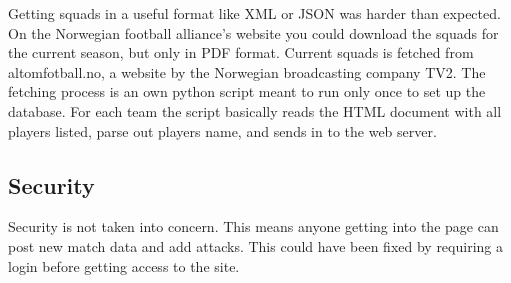 Getting squads in a useful format like \ac{XML} or \ac{JSON} was harder than expected. On the Norwegian football alliance's website you could download the squads for the current season, but only in PDF format. Current squads is fetched from altomfotball.no, a website by the Norwegian broadcasting company TV2. The fetching process is an own python script meant to run only once to set up the database. For each team the script basically reads the HTML document with all players listed, parse out players name, and sends in to the web server.


\subsection{Security}
Security is not taken into concern. This means anyone getting into the page can post new match data and add attacks. This could have been fixed by requiring a login before getting access to the site. 





